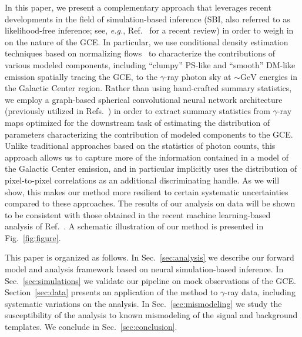 \documentclass[prd,aps,10pt,nofootinbib,twocolumn,superscriptaddress,preprintnumbers,balancelastpage,longbibliography]{revtex4-1}
\begin{document}
In this paper, we present a complementary approach that leverages recent developments in the field of simulation-based inference (SBI, also referred to as likelihood-free inference; see, \emph{e.g.}, Ref.~\cite{cranmer2020frontier} for a recent review) in order to weigh in on the nature of the GCE. In particular, we use conditional density estimation techniques based on normalizing flows~\cite{papamakarios2019normalizing,rezende2015variational} to characterize the contributions of various modeled components, including ``clumpy'' PS-like and ``smooth'' DM-like emission spatially tracing the GCE, to the $\gamma$-ray photon sky at $\sim\mathrm{GeV}$ energies in the Galactic Center region. Rather than using hand-crafted summary statistics, we employ a graph-based spherical convolutional neural network architecture (previously utilized in Refs.~\cite{List:2020mzd,List:2021aer}) in order to extract summary statistics from $\gamma$-ray maps optimized for the downstream task of estimating the distribution of parameters characterizing the contribution of modeled components to the GCE. Unlike traditional approaches based on the statistics of photon counts, this approach allows us to capture more of the information contained in a model of the Galactic Center emission, and in particular implicitly uses the distribution of pixel-to-pixel correlations as an additional discriminating handle. As we will show, this makes our method more resilient to certain systematic uncertainties compared to these approaches. The results of our analysis on \Fermi data will be shown to be consistent with those obtained in the recent machine learning-based analysis of Ref.~\cite{List:2021aer}. A schematic illustration of our method is presented in Fig.~\ref{fig:figure}.

This paper is organized as follows. In Sec.~\ref{sec:analysis} we describe our forward model and analysis framework based on neural simulation-based inference. In Sec.~\ref{sec:simulations} we validate our pipeline on mock observations of the \Fermi GCE. Section~\ref{sec:data} presents an application of the method to \Fermi $\gamma$-ray data, including systematic variations on the analysis. In Sec.~\ref{sec:mismodeling} we study the susceptibility of the analysis to known mismodeling of the signal and background templates. We conclude in Sec.~\ref{sec:conclusion}.
\end{document}

